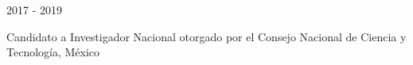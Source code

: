 

\begin{minipage}{1.5 in}
	2017 - 2019\\
\end{minipage}
\begin{minipage}{4.5in}
	Candidato a Investigador Nacional otorgado por el Consejo Nacional de Ciencia y Tecnología, México\\ 
\end{minipage}

